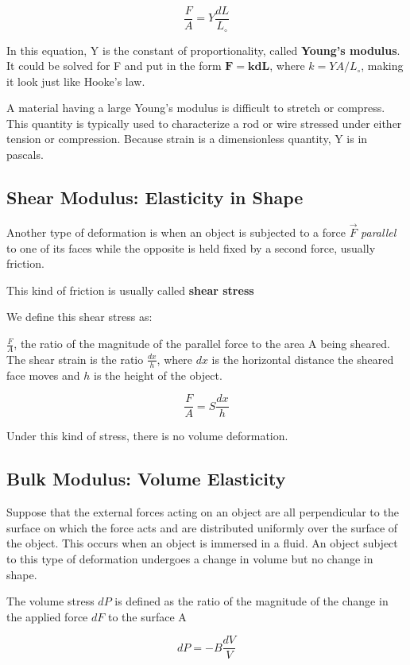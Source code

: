 \begin{form}
$$\frac{F}{A} = Y\frac{d L}{L_\circ}$$
\end{form}

In this equation, Y is the constant of proportionality, called \textbf{Young's modulus}. It could be solved for F and put in the form $\mathbf{F=kd L}$, where $k=YA/L_\circ$, making it look just like Hooke's law.

A material having a large Young's modulus is difficult to stretch or compress. This quantity is typically used to characterize a rod or wire stressed under either tension or compression. Because strain is a dimensionless quantity, Y is in pascals.

\subsection{Shear Modulus: Elasticity in Shape}
Another type of deformation is when an object is subjected to a force $\vec{F}$ \emph{parallel} to one of its faces while the opposite is held fixed by a second force, usually friction.

This kind of friction is usually called \textbf{shear stress}

We define this shear stress as:
\begin{defi}
$\frac{F}{A}$, the ratio of the magnitude of the parallel force to the area A being sheared. The shear strain is the ratio $\frac{d x}{h}$, where $d x$ is the horizontal distance the sheared face moves and $h$ is the height of the object.
\end{defi}

\begin{form}
$$\frac{F}{A}=S\frac{d x}{h}$$
\end{form}

Under this kind of stress, there is no volume deformation.

\subsection{Bulk Modulus: Volume Elasticity}
Suppose that the external forces acting on an object are all perpendicular to the surface on which the force acts and are distributed uniformly over the surface of the object. This occurs when an object is immersed in a fluid. An object subject to this type of deformation undergoes a change in volume but no change in shape. 

\begin{defi}
The volume stress $d P$ is defined as the ratio of the magnitude of the change in the applied force $d F$ to the surface A
\end{defi}
\begin{form}
$$d P=-B\frac{d V}{V}$$
\end{form}

